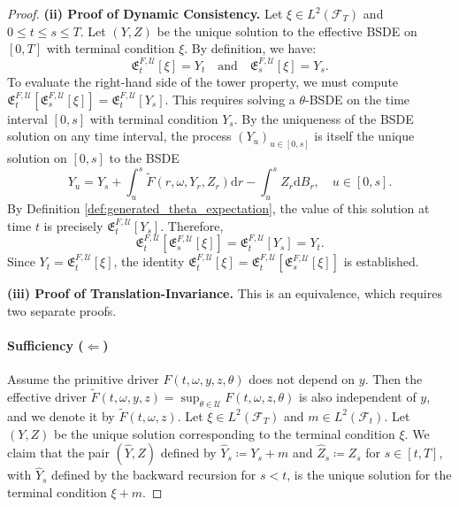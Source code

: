 \documentclass[12pt, letterpaper]{amsart}
\newcommand{\Efrak}{\mathfrak{E}}
\newcommand{\Efrakgen}{\Efrak^{F, \Ucal}}
\newcommand{\Ucal}{\mathcal{U}}
\newcommand{\dd}{\mathrm{d}}
\theoremstyle{plain}
\theoremstyle{definition}
\theoremstyle{remark}
\numberwithin{equation}{section} %
\begin{document}
\begin{proof}
\vspace{1ex}
\noindent\textbf{(ii) Proof of Dynamic Consistency.}
Let $\xi \in L^2(\mathcal{F}_T)$ and $0 \le t \le s \le T$. Let $(Y,Z)$ be the unique solution to the effective BSDE on $[0,T]$ with terminal condition $\xi$. By definition, we have:
\begin{equation*}
    \Efrakgen_t[\xi] = Y_t \quad \text{and} \quad \Efrakgen_s[\xi] = Y_s.
\end{equation*}
To evaluate the right-hand side of the tower property, we must compute $\Efrakgen_t[\Efrakgen_s[\xi]] = \Efrakgen_t[Y_s]$. This requires solving a $\theta$-BSDE on the time interval $[0,s]$ with terminal condition $Y_s$. By the uniqueness of the BSDE solution on any time interval, the process $(Y_u)_{u \in [0,s]}$ is itself the unique solution on $[0,s]$ to the BSDE
\begin{equation*}
    Y_u = Y_s + \int_u^s \tilde{F}(r, \omega, Y_r, Z_r) \dd r - \int_u^s Z_r \dd B_r, \quad u \in [0,s].
\end{equation*}
By Definition \ref{def:generated_theta_expectation}, the value of this solution at time $t$ is precisely $\Efrakgen_t[Y_s]$. Therefore,
\begin{equation*}
    \Efrakgen_t[\Efrakgen_s[\xi]] = \Efrakgen_t[Y_s] = Y_t.
\end{equation*}
Since $Y_t = \Efrakgen_t[\xi]$, the identity $\Efrakgen_t[\xi] = \Efrakgen_t[\Efrakgen_s[\xi]]$ is established.

\vspace{1ex}
\noindent\textbf{(iii) Proof of Translation-Invariance.}
This is an equivalence, which requires two separate proofs.

\paragraph{\textbf{Sufficiency ($\Leftarrow$)}} Assume the primitive driver $F(t,\omega,y,z,\theta)$ does not depend on $y$. Then the effective driver $\tilde{F}(t,\omega,y,z) = \sup_{\theta \in \Ucal} F(t,\omega,z,\theta)$ is also independent of $y$, and we denote it by $\tilde{F}(t,\omega,z)$. Let $\xi \in L^2(\mathcal{F}_T)$ and $m \in L^2(\mathcal{F}_t)$. Let $(Y,Z)$ be the unique solution corresponding to the terminal condition $\xi$. We claim that the pair $(\hat{Y}, \hat{Z})$ defined by $\hat{Y}_s \coloneqq Y_s + m$ and $\hat{Z}_s \coloneqq Z_s$ for $s \in [t,T]$, with $\hat{Y}_s$ defined by the backward recursion for $s<t$, is the unique solution for the terminal condition $\xi+m$.


\end{proof}
\end{document}
